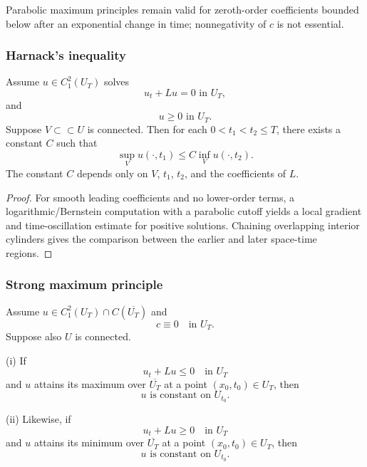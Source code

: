 \begin{remark}
\label{rem:parabolic-max-principle-negative-c}
Parabolic maximum principles remain valid for zeroth-order coefficients bounded below after an exponential change in time; nonnegativity of $c$ is not essential.
\end{remark}

\subsubsection{Harnack's inequality}

\begin{theorem}
\label{thm:parabolic-harnack-inequality}
Assume $u \in C^2_1(U_T)$ solves
\[
u_t + Lu = 0 \text{ in } U_T,
\tag{68}
\]
and
\[
u \geq 0 \text{ in } U_T.
\]
Suppose $V \subset\subset U$ is connected. Then for each $0 < t_1 < t_2 \leq T$, there exists a constant $C$ such that
\[
\sup_V u(\cdot, t_1) \leq C \inf_V u(\cdot, t_2).
\tag{69}
\]
The constant $C$ depends only on $V$, $t_1$, $t_2$, and the coefficients of $L$.
\end{theorem}

\begin{proof}
\sketch For smooth leading coefficients and no lower-order terms, a logarithmic/Bernstein computation with a parabolic cutoff yields a local gradient and time-oscillation estimate for positive solutions. Chaining overlapping interior cylinders gives the comparison between the earlier and later space-time regions.
\end{proof}

\subsubsection{Strong maximum principle}

\begin{theorem}
\label{thm:parabolic-strong-maximum-principle}
Assume $u \in C_1^2(U_T) \cap C(\overline{U_T})$ and
\[
c \equiv 0 \quad \text{in } U_T.
\]
Suppose also $U$ is connected.

(i) If
\[
u_t + Lu \leq 0 \quad \text{in } U_T
\]
and $u$ attains its maximum over $\overline{U_T}$ at a point $(x_0, t_0) \in U_T$, then
\[
u \text{ is constant on } U_{t_0}.
\]

(ii) Likewise, if
\[
u_t + Lu \geq 0 \quad \text{in } U_T
\]
and $u$ attains its minimum over $\overline{U_T}$ at a point $(x_0, t_0) \in U_T$, then
\[
u \text{ is constant on } U_{t_0}.
\]
\end{theorem}


